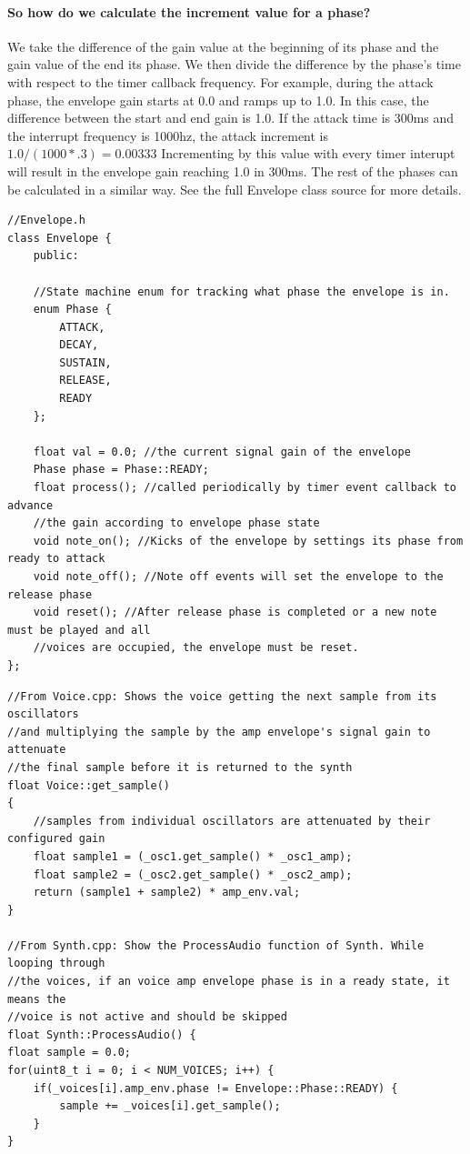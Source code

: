 \documentclass[acmlarge,screen]{acmart}
\begin{document}
	\paragraph{So how do we calculate the increment value for a phase?} We take the difference of the gain value at the beginning of its phase and the gain value of the end its phase. We then divide the difference by the phase's time with respect to the timer callback frequency. For example, during the attack phase, the envelope gain starts at 0.0 and ramps up to 1.0. In this case, the difference between the start and end gain is 1.0. If the attack time is 300ms and the interrupt frequency is 1000hz, the attack increment is \( 1.0/(1000*.3)=0.00333 \) Incrementing by this value with every timer interupt will result in the envelope gain reaching 1.0 in 300ms. The rest of the phases can be calculated in a similar way. See the full Envelope class source for more details.
	
	\begin{verbatim}
//Envelope.h
class Envelope {
	public:
	
	//State machine enum for tracking what phase the envelope is in.
	enum Phase {
		ATTACK,
		DECAY,
		SUSTAIN,
		RELEASE,
		READY 
	};
	
	float val = 0.0; //the current signal gain of the envelope
	Phase phase = Phase::READY;
	float process(); //called periodically by timer event callback to advance
	//the gain according to envelope phase state
	void note_on(); //Kicks of the envelope by settings its phase from ready to attack
	void note_off(); //Note off events will set the envelope to the release phase
	void reset(); //After release phase is completed or a new note must be played and all
	//voices are occupied, the envelope must be reset.
};
	\end{verbatim}
	
	\begin{verbatim}
//From Voice.cpp: Shows the voice getting the next sample from its oscillators
//and multiplying the sample by the amp envelope's signal gain to attenuate
//the final sample before it is returned to the synth
float Voice::get_sample()
{   
	//samples from individual oscillators are attenuated by their configured gain
	float sample1 = (_osc1.get_sample() * _osc1_amp);
	float sample2 = (_osc2.get_sample() * _osc2_amp);
	return (sample1 + sample2) * amp_env.val;
}

//From Synth.cpp: Show the ProcessAudio function of Synth. While looping through
//the voices, if an voice amp envelope phase is in a ready state, it means the 
//voice is not active and should be skipped
float Synth::ProcessAudio() {
float sample = 0.0;
for(uint8_t i = 0; i < NUM_VOICES; i++) {
	if(_voices[i].amp_env.phase != Envelope::Phase::READY) {
		sample += _voices[i].get_sample();
	}
}
	\end{verbatim}
	
\end{document}
